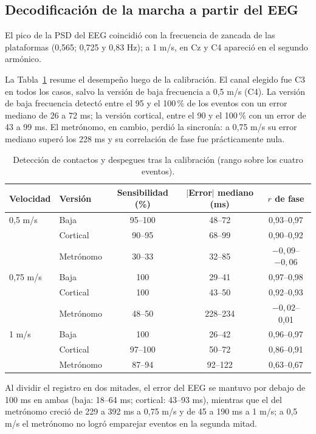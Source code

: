 \documentclass[10pt]{article}
\begin{document}
\subsection{Decodificación de la marcha a partir del EEG}

El pico de la PSD del EEG coincidió con la frecuencia de zancada de las plataformas (0,565; 0,725 y 0,83 Hz); a 1 m/s, en Cz y C4 apareció en el segundo armónico.

La Tabla~\ref{tab:decod} resume el desempeño luego de la calibración. El canal elegido fue C3 en todos los casos, salvo la versión de baja frecuencia a 0,5 m/s (C4). La versión de baja frecuencia detectó entre el 95 y el 100\,\% de los eventos con un error mediano de 26 a 72 ms; la versión cortical, entre el 90 y el 100\,\% con un error de 43 a 99 ms. El metrónomo, en cambio, perdió la sincronía: a 0,75 m/s su error mediano superó los 228 ms y su correlación de fase fue prácticamente nula.

\begin{table}[H]
\centering
\small
\begin{tabular}{llccc}
\toprule
Velocidad & Versión & Sensibilidad (\%) & $|$Error$|$ mediano (ms) & $r$ de fase \\
\midrule
0,5 m/s  & Baja      & 95--100 & 48--72  & 0,93--0,97 \\
         & Cortical  & 90--95  & 68--99  & 0,90--0,92 \\
         & Metrónomo & 30--33  & 32--85  & $-0{,}09$--$-0{,}06$ \\
\midrule
0,75 m/s & Baja      & 100     & 29--41  & 0,97--0,98 \\
         & Cortical  & 100     & 43--50  & 0,92--0,93 \\
         & Metrónomo & 48--50  & 228--234 & $-0{,}02$--0,01 \\
\midrule
1 m/s    & Baja      & 100     & 26--42  & 0,96--0,97 \\
         & Cortical  & 97--100 & 50--72  & 0,86--0,91 \\
         & Metrónomo & 87--94  & 92--122 & 0,63--0,67 \\
\bottomrule
\end{tabular}
\vspace{1mm}
\caption{Detección de contactos y despegues tras la calibración (rango sobre los cuatro eventos).}
\label{tab:decod}
\end{table}

Al dividir el registro en dos mitades, el error del EEG se mantuvo por debajo de 100 ms en ambas (baja: 18--64 ms; cortical: 43--93 ms), mientras que el del metrónomo creció de 229 a 392 ms a 0,75 m/s y de 45 a 190 ms a 1 m/s; a 0,5 m/s el metrónomo no logró emparejar eventos en la segunda mitad.
\end{document}
